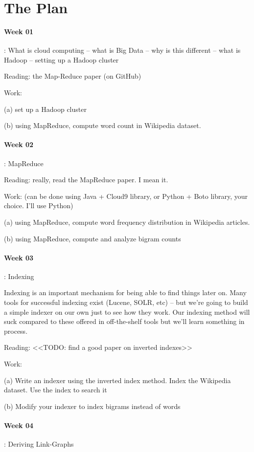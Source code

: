 \documentclass[12pt]{article}
\begin{document}
\section{The Plan}

\paragraph{Week 01}: What is cloud computing -- what is Big Data -- why is this different -- what is Hadoop -- setting up a Hadoop cluster

Reading: the Map-Reduce paper (on GitHub)

Work:

(a) set up a Hadoop cluster

(b) using MapReduce, compute word count in Wikipedia dataset.

\paragraph{Week 02}: MapReduce

Reading: really, read the MapReduce paper. I mean it. 

Work: 
(can be done using Java + Cloud9 library, or Python + Boto library, your choice. I'll use Python)

(a) using MapReduce, compute word frequency distribution in Wikipedia articles. 

(b) using MapReduce, compute and analyze bigram counts

\paragraph{Week 03}: Indexing

Indexing is an important mechanism for being able to find things later on. Many tools for successful indexing exist (Lucene, SOLR, etc) -- but we're going to build a simple indexer on our own just to see how they work. Our indexing method will suck compared to these offered in off-the-shelf tools but we'll learn something in process. 

Reading: <<TODO: find a good paper on inverted indexes>>

Work: 

(a) Write an indexer using the inverted index method. Index the Wikipedia dataset. Use the index to search it

(b) Modify your indexer to index bigrams instead of words

\paragraph{Week 04}: Deriving Link-Graphs
\end{document}
